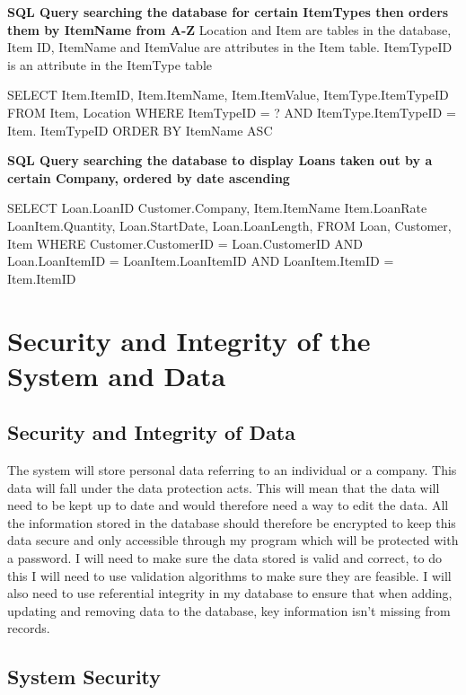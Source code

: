\textbf{SQL Query searching the database for certain ItemTypes then orders them by ItemName from A-Z}
Location and Item are tables in the database, Item ID, ItemName and ItemValue are attributes in the Item table. ItemTypeID is an attribute in the ItemType table

\begin{sql}
    SELECT 
    Item.ItemID,
    Item.ItemName,
    Item.ItemValue,
    ItemType.ItemTypeID
    FROM Item, Location
    WHERE ItemTypeID = ? AND
    ItemType.ItemTypeID = Item. ItemTypeID
    ORDER BY ItemName ASC
\end{sql}

\textbf{SQL Query searching the database to display Loans taken out by a certain Company, ordered by date ascending}

\begin{sql}
    SELECT
    Loan.LoanID
    Customer.Company,
    Item.ItemName
    Item.LoanRate
    LoanItem.Quantity,
    Loan.StartDate,
    Loan.LoanLength,
    FROM Loan, Customer, Item
    WHERE Customer.CustomerID = Loan.CustomerID AND Loan.LoanItemID = LoanItem.LoanItemID AND LoanItem.ItemID = Item.ItemID
\end{sql}

\section{Security and Integrity of the System and Data}

\subsection{Security and Integrity of Data}

The system will store personal data referring to an individual or a company. This data will fall under the data protection acts. This will mean that the data will need to be kept up to date and would therefore need a way to edit the data. All the information stored in the database should therefore be encrypted to keep this data secure and only accessible through my program which will be protected with a password. I will need to make sure the data stored is valid and correct, to do this I will need to use validation algorithms to make sure they are feasible. I will also need to use referential integrity in my database to ensure that when adding, updating and removing data to the database, key information isn't missing from records.

\subsection{System Security}

